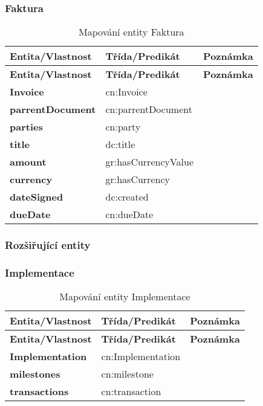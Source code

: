 \subsubsection*{Faktura}

\begin{center}
\begin{longtable}{lll}
\label{grid_mlmmh} \\
\multicolumn{1}{l}{\textbf{Entita/Vlastnost}} & 
\multicolumn{1}{l}{\textbf{Třída/Predikát}} & 
\multicolumn{1}{l}{\textbf{Poznámka}} \\ \hline 
\endfirsthead
\multicolumn{1}{l}{\textbf{Entita/Vlastnost}} & 
\multicolumn{1}{l}{\textbf{Třída/Predikát}} & 
\multicolumn{1}{l}{\textbf{Poznámka}} \\ \hline 
\hline
\endhead
\endfoot
\caption{Mapování entity Faktura}
\endlastfoot
\textbf{Invoice} & cn:Invoice \\
\textbf{parrentDocument} & cn:parrentDocument \\
\textbf{parties} & cn:party \\
\textbf{title} & dc:title \\
\textbf{amount} & gr:hasCurrencyValue \\
\textbf{currency} & gr:hasCurrency \\
\textbf{dateSigned} & dc:created \\
\textbf{dueDate} & cn:dueDate \\
\end{longtable}
\end{center}

\subsubsection*{Rozšiřující entity}

\subsubsection*{Implementace}

\begin{center}
\begin{longtable}{lll}
\label{grid_mlmmh} \\
\multicolumn{1}{l}{\textbf{Entita/Vlastnost}} & 
\multicolumn{1}{l}{\textbf{Třída/Predikát}} & 
\multicolumn{1}{l}{\textbf{Poznámka}} \\ \hline 
\endfirsthead
\multicolumn{1}{l}{\textbf{Entita/Vlastnost}} & 
\multicolumn{1}{l}{\textbf{Třída/Predikát}} & 
\multicolumn{1}{l}{\textbf{Poznámka}} \\ \hline 
\hline
\endhead
\endfoot
\caption{Mapování entity Implementace}
\endlastfoot
\textbf{Implementation} & cn:Implementation \\
\textbf{milestones} & cn:milestone \\
\textbf{transactions} & cn:transaction \\
\end{longtable}
\end{center}

